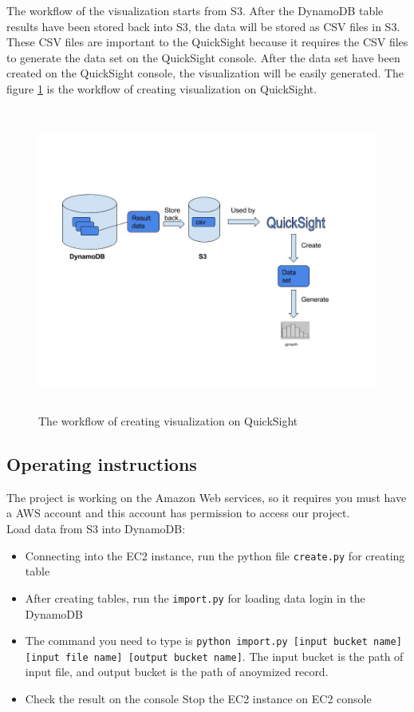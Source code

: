 \noindent The workflow of the visualization starts from S3. After the DynamoDB table results have been stored back into S3, the data will be stored as CSV files in S3. These CSV files are important to the QuickSight because it requires the CSV files to generate the data set on the QuickSight console. After the data set have been created on the QuickSight console, the visualization will be easily generated. The figure \ref{fig:3} is the workflow of creating visualization on QuickSight.  

\begin{figure}[H]
	\includegraphics[width=17cm, height=10cm]{Pictures/QuickSight_workflow.jpg}
    \centering
    \caption{\label{fig:3}The workflow of creating visualization on QuickSight}
\end{figure}


\subsection{Operating instructions}
The project is working on the Amazon Web services, so it requires you must have a AWS account and this account has permission to access our project.\\

\noindent Load data from S3 into DynamoDB:
\begin{itemize}
	\item Connecting into the EC2 instance, run the python file \texttt{create.py} for creating table
    \item After creating tables, run the \texttt{import.py} for loading data login in the DynamoDB
    \item The command you need to type is \texttt{python import.py [input bucket name] [input file name] [output bucket name]}. The input bucket is the path of input file, and output bucket is the path of anoymized record.
    \item Check the result on the console Stop the EC2 instance on EC2 console
\end{itemize}

